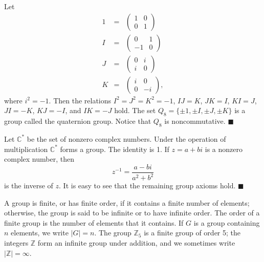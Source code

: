 
\medskip 
 
 
Let
\begin{eqnarray*}
1
& = &
\left(
\begin{array}{cc}
1 & 0 \\
0 & 1
\end{array}
\right)
\\
I
& = &
\left(
\begin{array}{cc}
0 & 1 \\
-1 & 0
\end{array}
\right)
\\
J
& = &
\left(
\begin{array}{cc}
0 & i \\
i & 0
\end{array}
\right)
\\
K & = &
\left(
\begin{array}{cc}
i & 0 \\
0 & -i
\end{array}
\right),
\end{eqnarray*}
where $i^2 = -1$. Then the relations $I^2 = J^2 = K^2 = -1$, $IJ=K$,
$JK=I$, $KI=J$, $JI=-K$, $KJ=-I$, and $IK=-J$ hold. The set
$Q_8\label{notequateriongroup} = \{
\pm 1, \pm I, \pm J, \pm K  \}$ is a group called the {\bfi quaternion
group}. Notice that  $Q_8$
is noncommutative. 
\hspace{\fill} $\blacksquare$
 
 
\medskip
 
 
Let ${\mathbb C}^\ast$\label{noteCstar} be the set of nonzero complex 
numbers. Under the
operation of multiplication ${\mathbb C}^\ast$ forms a group.  The
identity is 1. If $z = a+bi$ is a nonzero complex number, then
$$
z^{-1} = \frac{a -bi}{a^2 +b^2}
$$
is the inverse of $z$.  It is easy to see that the remaining group
axioms hold. 
\mbox{\hspace{1in}}
\hspace{\fill} $\blacksquare$
 
 
\medskip
 
 
A group is {\bfi finite}, or has {\bfi finite
order}, if it contains a finite number of elements; otherwise, the
group is said to be {\bfi infinite\/} or to have {\bfi infinite
order}. The {\bfi order\/}
of a finite group is the number of elements that it contains. If $G$
is a group containing $n$ elements, we write $|G| =
n$\label{noteorder}. The group ${\mathbb Z}_5$ is a finite group of order
5; the integers ${\mathbb Z}$ form an infinite group under addition, and
we sometimes write $|{\mathbb Z}| = \infty$.
 
